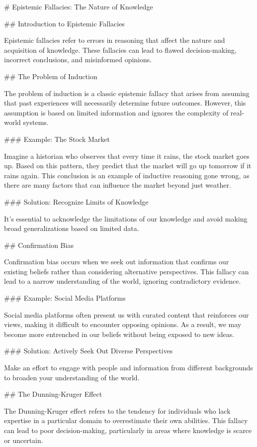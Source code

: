 # Epistemic Fallacies: The Nature of Knowledge

## Introduction to Epistemic Fallacies

Epistemic fallacies refer to errors in reasoning that affect the nature and acquisition of knowledge. These fallacies can lead to flawed decision-making, incorrect conclusions, and misinformed opinions.

## The Problem of Induction

The problem of induction is a classic epistemic fallacy that arises from assuming that past experiences will necessarily determine future outcomes. However, this assumption is based on limited information and ignores the complexity of real-world systems.

### Example: The Stock Market

Imagine a historian who observes that every time it rains, the stock market goes up. Based on this pattern, they predict that the market will go up tomorrow if it rains again. This conclusion is an example of inductive reasoning gone wrong, as there are many factors that can influence the market beyond just weather.

### Solution: Recognize Limits of Knowledge

It's essential to acknowledge the limitations of our knowledge and avoid making broad generalizations based on limited data.

## Confirmation Bias

Confirmation bias occurs when we seek out information that confirms our existing beliefs rather than considering alternative perspectives. This fallacy can lead to a narrow understanding of the world, ignoring contradictory evidence.

### Example: Social Media Platforms

Social media platforms often present us with curated content that reinforces our views, making it difficult to encounter opposing opinions. As a result, we may become more entrenched in our beliefs without being exposed to new ideas.

### Solution: Actively Seek Out Diverse Perspectives

Make an effort to engage with people and information from different backgrounds to broaden your understanding of the world.

## The Dunning-Kruger Effect

The Dunning-Kruger effect refers to the tendency for individuals who lack expertise in a particular domain to overestimate their own abilities. This fallacy can lead to poor decision-making, particularly in areas where knowledge is scarce or uncertain.

